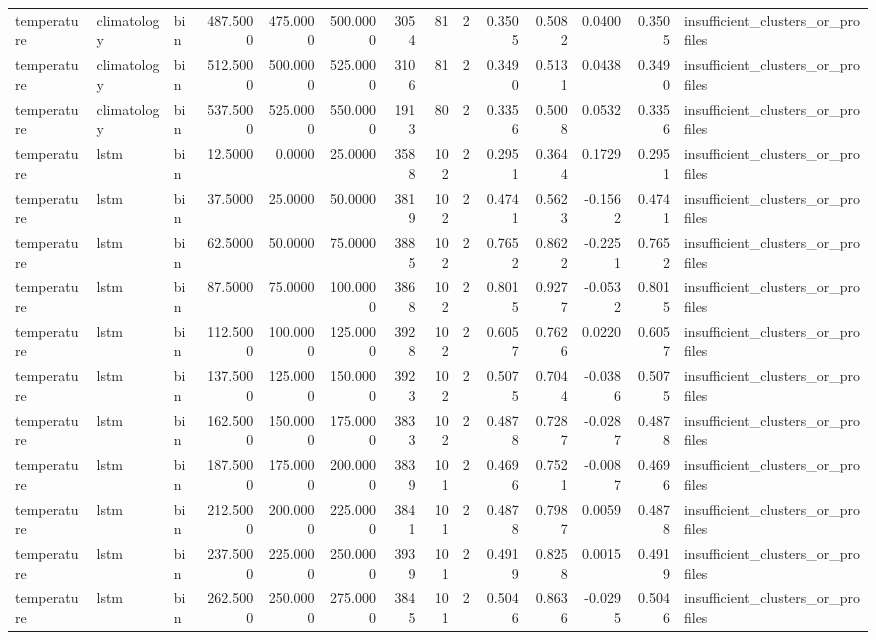 \begin{tabular}{lllrrrrrrrrrrl}
temperature & climatology & bin & 487.5000 & 475.0000 & 500.0000 & 3054 & 81 & 2 & 0.3505 & 0.5082 & 0.0400 & 0.3505 & insufficient_clusters_or_profiles \\
temperature & climatology & bin & 512.5000 & 500.0000 & 525.0000 & 3106 & 81 & 2 & 0.3490 & 0.5131 & 0.0438 & 0.3490 & insufficient_clusters_or_profiles \\
temperature & climatology & bin & 537.5000 & 525.0000 & 550.0000 & 1913 & 80 & 2 & 0.3356 & 0.5008 & 0.0532 & 0.3356 & insufficient_clusters_or_profiles \\
temperature & lstm & bin & 12.5000 & 0.0000 & 25.0000 & 3588 & 102 & 2 & 0.2951 & 0.3644 & 0.1729 & 0.2951 & insufficient_clusters_or_profiles \\
temperature & lstm & bin & 37.5000 & 25.0000 & 50.0000 & 3819 & 102 & 2 & 0.4741 & 0.5623 & -0.1562 & 0.4741 & insufficient_clusters_or_profiles \\
temperature & lstm & bin & 62.5000 & 50.0000 & 75.0000 & 3885 & 102 & 2 & 0.7652 & 0.8622 & -0.2251 & 0.7652 & insufficient_clusters_or_profiles \\
temperature & lstm & bin & 87.5000 & 75.0000 & 100.0000 & 3868 & 102 & 2 & 0.8015 & 0.9277 & -0.0532 & 0.8015 & insufficient_clusters_or_profiles \\
temperature & lstm & bin & 112.5000 & 100.0000 & 125.0000 & 3928 & 102 & 2 & 0.6057 & 0.7626 & 0.0220 & 0.6057 & insufficient_clusters_or_profiles \\
temperature & lstm & bin & 137.5000 & 125.0000 & 150.0000 & 3923 & 102 & 2 & 0.5075 & 0.7044 & -0.0386 & 0.5075 & insufficient_clusters_or_profiles \\
temperature & lstm & bin & 162.5000 & 150.0000 & 175.0000 & 3833 & 102 & 2 & 0.4878 & 0.7287 & -0.0287 & 0.4878 & insufficient_clusters_or_profiles \\
temperature & lstm & bin & 187.5000 & 175.0000 & 200.0000 & 3839 & 101 & 2 & 0.4696 & 0.7521 & -0.0087 & 0.4696 & insufficient_clusters_or_profiles \\
temperature & lstm & bin & 212.5000 & 200.0000 & 225.0000 & 3841 & 101 & 2 & 0.4878 & 0.7987 & 0.0059 & 0.4878 & insufficient_clusters_or_profiles \\
temperature & lstm & bin & 237.5000 & 225.0000 & 250.0000 & 3939 & 101 & 2 & 0.4919 & 0.8258 & 0.0015 & 0.4919 & insufficient_clusters_or_profiles \\
temperature & lstm & bin & 262.5000 & 250.0000 & 275.0000 & 3845 & 101 & 2 & 0.5046 & 0.8636 & -0.0295 & 0.5046 & insufficient_clusters_or_profiles \\

\end{tabular}
